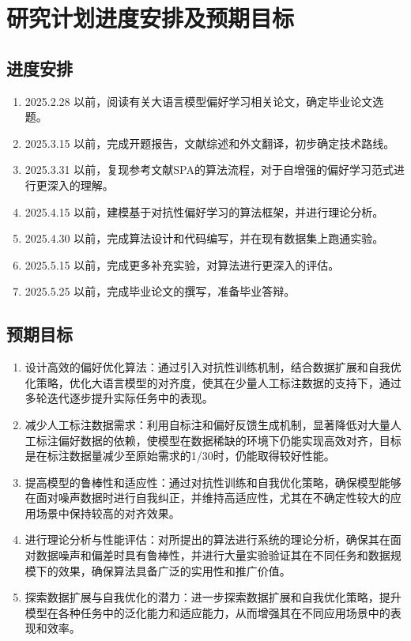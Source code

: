 \section{研究计划进度安排及预期目标}

\subsection{进度安排}

\begin{enumerate}
    \item 2025.2.28 以前，阅读有关大语言模型偏好学习相关论文，确定毕业论文选题。
    \item 2025.3.15 以前，完成开题报告，文献综述和外文翻译，初步确定技术路线。
    \item 2025.3.31 以前，复现参考文献SPA的算法流程，对于自增强的偏好学习范式进行更深入的理解。
    \item 2025.4.15 以前，建模基于对抗性偏好学习的算法框架，并进行理论分析。
    \item 2025.4.30 以前，完成算法设计和代码编写，并在现有数据集上跑通实验。
    \item 2025.5.15 以前，完成更多补充实验，对算法进行更深入的评估。
    \item 2025.5.25 以前，完成毕业论文的撰写，准备毕业答辩。
\end{enumerate}

\subsection{预期目标}

\begin{enumerate}
	\item 设计高效的偏好优化算法：通过引入对抗性训练机制，结合数据扩展和自我优化策略，优化大语言模型的对齐度，使其在少量人工标注数据的支持下，通过多轮迭代逐步提升实际任务中的表现。
	\item 减少人工标注数据需求：利用自标注和偏好反馈生成机制，显著降低对大量人工标注偏好数据的依赖，使模型在数据稀缺的环境下仍能实现高效对齐，目标是在标注数据量减少至原始需求的1/30时，仍能取得较好性能。
	\item 提高模型的鲁棒性和适应性：通过对抗性训练和自我优化策略，确保模型能够在面对噪声数据时进行自我纠正，并维持高适应性，尤其在不确定性较大的应用场景中保持较高的对齐效果。
	\item 进行理论分析与性能评估：对所提出的算法进行系统的理论分析，确保其在面对数据噪声和偏差时具有鲁棒性，并进行大量实验验证其在不同任务和数据规模下的效果，确保算法具备广泛的实用性和推广价值。
	\item 探索数据扩展与自我优化的潜力：进一步探索数据扩展和自我优化策略，提升模型在各种任务中的泛化能力和适应能力，从而增强其在不同应用场景中的表现和效率。
\end{enumerate}